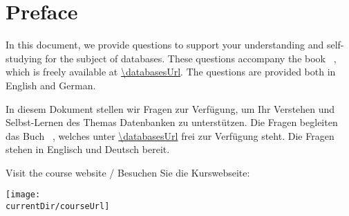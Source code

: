 \chapter*{Preface}%
%
%
In this document, we provide questions to support your understanding and self-studying for the subject of databases.
These questions accompany the book ~\cite{databases}, which is freely available at \expandafter\url{\databasesUrl}.
The questions are provided both in English and German.

In diesem Dokument stellen wir Fragen zur Verfügung, um Ihr Verstehen und Selbst-Lernen des Themas Datenbanken zu unterstützen.
Die Fragen begleiten das Buch ~\cite{databases}, welches unter \expandafter\url{\databasesUrl} frei zur Verfügung steht.
Die Fragen stehen in Englisch und Deutsch bereit.

Visit the course website / Besuchen Sie die Kurswebseite:%
\begin{center}%
\texttt{[image: \\currentDir/courseUrl]}%
\end{center}%
